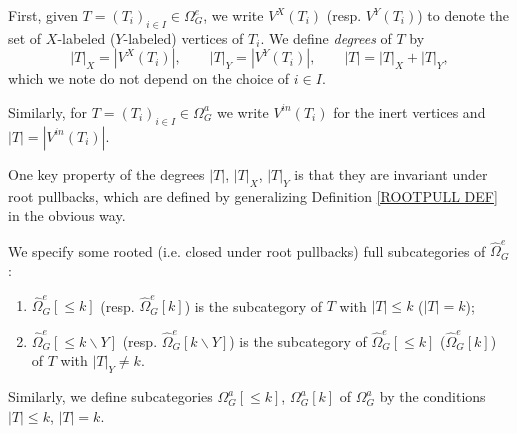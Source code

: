 \documentclass[a4paper,10pt]{article}%
\begin{document}
First, given 
$T = (T_i)_{i \in I} \in \Omega_G^e$,
we write $V^X(T_i)$ (resp. $V^Y(T_i)$)
to denote the set of 
$X$-labeled ($Y$-labeled) vertices of $T_i$.
We define \textit{degrees} of $T$ by
\[
|T|_X = |V^X(T_i)|,
	\qquad
|T|_Y = |V^Y(T_i)|,
	\qquad
|T| = |T|_X + |T|_Y,
\]
which we note do not depend on the choice of $i \in I$.

Similarly, for $T = (T_i)_{i \in I} \in \Omega_G^a$
we write $V^{in}(T_i)$ for the inert vertices and
$|T| = |V^{in}(T_i)|$.

\begin{remark}
	One key property of the degrees $|T|$, $|T|_X$, $|T|_Y$ is that they are invariant under root pullbacks, which are defined
	by generalizing Definition \ref{ROOTPULL DEF}
	in the obvious way.
\end{remark}


\begin{definition}\label{TREE_FILTRATION_PIECES_DEFINITION}
We specify some rooted (i.e. closed under root pullbacks)
full subcategories
 of $\widehat{\Omega}_{G}^e$: 
  \begin{enumerate}
  \item $\widehat{\Omega}_G^e[\leq\! k]$ 
  (resp. $\widehat{\Omega}_G^e[k]$) is the subcategory of $T$ with $|T|\leq k$ ($|T| = k$);
  \item $\widehat{\Omega}_G^e[\leq\! k \mathbin{\backslash} Y]$
  (resp. $\widehat{\Omega}_G^e[k \mathbin{\backslash} Y]$) is the subcategory of $\widehat{\Omega}_G^e[\leq\! k]$ 
  ($\widehat{\Omega}_G^e[k]$) of $T$ with $|T|_{Y}\neq k$.
  \end{enumerate}
Similarly, we define subcategories 
$\Omega_G^a[\leq \! k]$, 
$\Omega_G^a[k]$ of $\Omega_G^a$
by the conditions $|T|\leq k$, $|T|=k$.
\end{definition}
\end{document}
